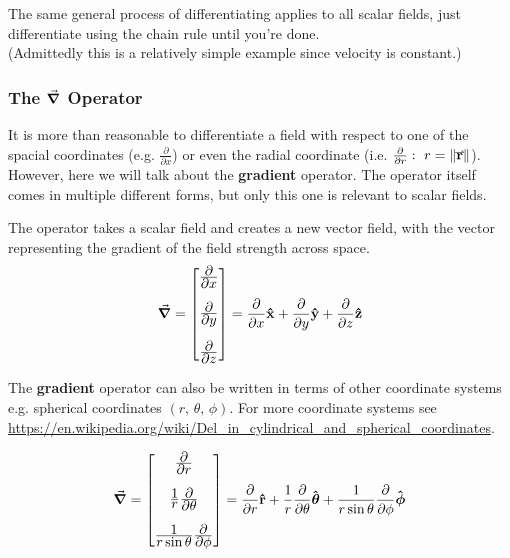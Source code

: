 \documentclass[main.tex]{subfiles}
\begin{document}
                    The same general process of differentiating applies to all scalar fields, just differentiate using the chain rule until you're done.\\
                    (Admittedly this is a relatively simple example since velocity is constant.)

                \newpage
                \subsubsection{The $\grad{}$ Operator}
                    \label{subsubsec: The Grad Operator}

                    It is more than reasonable to differentiate a field with respect to one of the spacial coordinates (e.g. $\frac{\partial}{\partial x}$) or even the radial coordinate (i.e. $\frac{\partial}{\partial r}:\,\, r = \vmod{\vect{r}}$).\\
                    However, here we will talk about the \textbf{gradient} operator. The operator itself comes in multiple different forms, but only this one is relevant to scalar fields.
                    
                    The operator takes a scalar field and creates a new vector field, with the vector representing the gradient of the field strength across space.
                    \begin{equation}
                        \grad{} = \Matrix{\bfrac{\partial}{\partial x} \vspace{1em}\\\bfrac{\partial}{\partial y} \vspace{1em}\\\bfrac{\partial}{\partial z}} = \bfrac{\partial}{\partial x}\vhat{x} + \bfrac{\partial}{\partial y}\vhat{y} + \bfrac{\partial}{\partial z}\vhat{z}
                        \label{eq: Grad Cartesian Form}
                    \end{equation}

                    The \textbf{gradient} operator can also be written in terms of other coordinate systems e.g. spherical coordinates $(r,\, \theta,\, \phi)$. For more coordinate systems see \url{https://en.wikipedia.org/wiki/Del_in_cylindrical_and_spherical_coordinates}.

                    \begin{equation}
                        \grad{} = \Matrix{\bfrac{\partial}{\partial r} \vspace{1em} \\ \bfrac{1}{r} \bfrac{\partial}{\partial \theta} \vspace{1em}\\ \bfrac{1}{r\sin\theta}\bfrac{\partial}{\partial \phi}} = \bfrac{\partial}{\partial r} \vhat{r} + \bfrac{1}{r} \bfrac{\partial}{\partial \theta} \vhat{\theta} + \bfrac{1}{r\sin\theta}\bfrac{\partial}{\partial \phi} \vhat{\phi}
                        \label{eq: Grad Spherical Form}
                    \end{equation}
\end{document}
